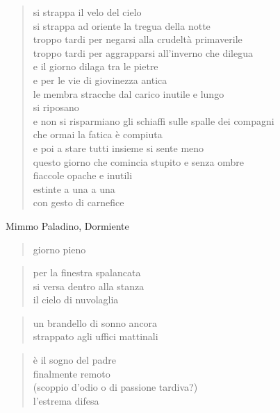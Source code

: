 	\begin{verse}
		si strappa il velo del cielo\\
		si strappa ad oriente la tregua della notte\\
		troppo tardi per negarsi alla crudeltà primaverile\\
		troppo tardi per aggrapparsi all'inverno che dilegua\\
		e il giorno dilaga tra le pietre\\
		e per le vie di giovinezza antica\\
		le membra stracche dal carico inutile e lungo\\
		si riposano\\
		e non si risparmiano gli schiaffi sulle spalle dei compagni\\
		che ormai la fatica è compiuta\\
		e poi a stare tutti insieme si sente meno\\
		questo giorno che comincia stupito e senza ombre\\
		fiaccole opache e inutili\\
		estinte a una a una\\
		con gesto di carnefice
	\end{verse}

\clearpage


\begin{artItem}
	Mimmo Paladino, Dormiente
\end{artItem}

	\begin{verse}
		giorno pieno
	\end{verse}

	\begin{verse}
		per la finestra spalancata\\
		si versa dentro alla stanza\\
		il cielo di nuvolaglia
	\end{verse}

	\begin{verse}
		un brandello di sonno ancora\\
		strappato agli uffici mattinali
	\end{verse}

	\begin{verse}
		è il sogno del padre\\
		finalmente remoto\\
		(scoppio d’odio o di passione tardiva?)\\
		l’estrema difesa
	\end{verse}

